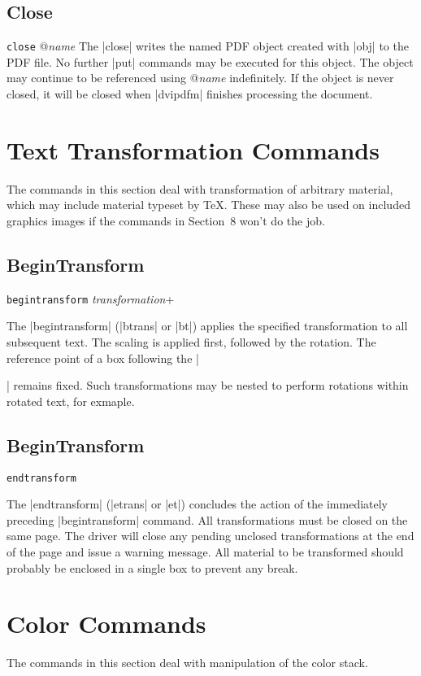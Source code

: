 {\subsection{Close}
\syntax
{\tt close} @{\it name}
\description
The |close| writes the named PDF object created with |obj| to the PDF file.
No further |put| commands may be executed for this object.
The object may continue to be referenced using @{\it name}
indefinitely.  If the object is never closed, it will
be closed when |dvipdfm| finishes processing the document.

\section{Text Transformation Commands}
The commands in this section deal with transformation
of arbitrary material, which may include
material typeset by \TeX.  These
may also be used on included graphics images
if the commands in Section~8 won't do the job.


\subsection{BeginTransform}
\syntax
{\tt begintransform} {\it transformation}+

\description
The |begintransform| (|btrans| or |bt|) applies
the specified transformation to all subsequent text.
The scaling is applied first, followed by the rotation.
The reference point of a box following
the |\special| remains fixed.  Such transformations
may be nested to perform rotations within rotated text, for exmaple.

\example
\begintt
{}
\endtt

\subsection{BeginTransform}
\syntax
{\tt endtransform}

\description
The |endtransform| (|etrans| or |et|) concludes
the action of the immediately preceding |begintransform|
command.  All transformations must be closed
on the same page.  The driver will close
any pending unclosed transformations at the
end of the page and issue a warning message.
All material to be transformed
should probably be enclosed in a single box
to prevent any break.
\example
\begintt
{}
\endtt


\section{Color Commands}
The commands in this section deal with manipulation of the color
stack.

}
